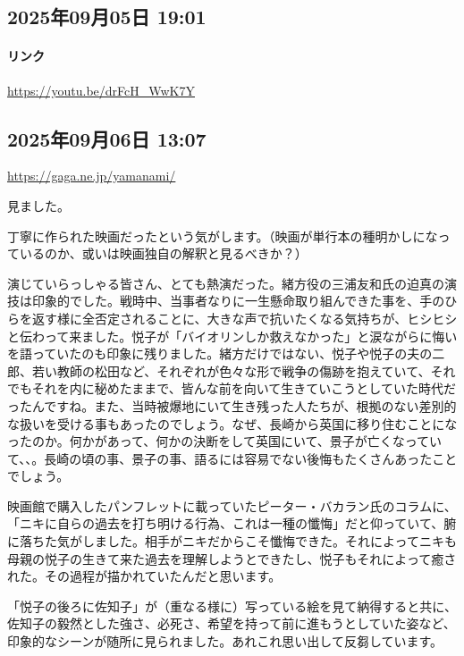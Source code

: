 \subsection*{2025年09月05日 19:01}

\paragraph{リンク}
\url{https://youtu.be/drFcH_WwK7Y}

\subsection*{2025年09月06日 13:07}

\url{https://gaga.ne.jp/yamanami/}

見ました。

丁寧に作られた映画だったという気がします。（映画が単行本の種明かしになっているのか、或いは映画独自の解釈と見るべきか？）

演じていらっしゃる皆さん、とても熱演だった。緒方役の三浦友和氏の迫真の演技は印象的でした。戦時中、当事者なりに一生懸命取り組んできた事を、手のひらを返す様に全否定されることに、大きな声で抗いたくなる気持ちが、ヒシヒシと伝わって来ました。悦子が「バイオリンしか救えなかった」と涙ながらに悔いを語っていたのも印象に残りました。緒方だけではない、悦子や悦子の夫の二郎、若い教師の松田など、それぞれが色々な形で戦争の傷跡を抱えていて、それでもそれを内に秘めたままで、皆んな前を向いて生きていこうとしていた時代だったんですね。また、当時被爆地にいて生き残った人たちが、根拠のない差別的な扱いを受ける事もあったのでしょう。なぜ、長崎から英国に移り住むことになったのか。何かがあって、何かの決断をして英国にいて、景子が亡くなっていて、、。長崎の頃の事、景子の事、語るには容易でない後悔もたくさんあったことでしょう。

映画館で購入したパンフレットに載っていたピーター・バカラン氏のコラムに、「ニキに自らの過去を打ち明ける行為、これは一種の懺悔」だと仰っていて、腑に落ちた気がしました。相手がニキだからこそ懺悔できた。それによってニキも母親の悦子の生きて来た過去を理解しようとできたし、悦子もそれによって癒された。その過程が描かれていたんだと思います。

「悦子の後ろに佐知子」が（重なる様に）写っている絵を見て納得すると共に、佐知子の毅然とした強さ、必死さ、希望を持って前に進もうとしていた姿など、印象的なシーンが随所に見られました。あれこれ思い出して反芻しています。


